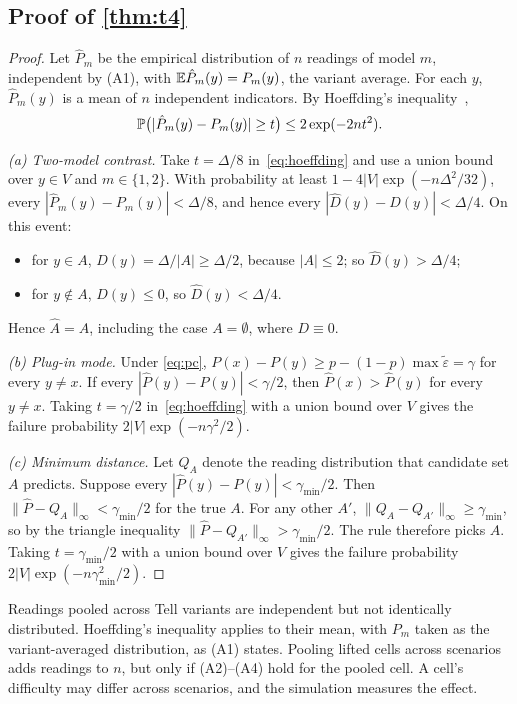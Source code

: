 \subsection{Proof of \cref{thm:t4}}

\begin{proof}
Let $\hat P_m$ be the empirical distribution of $n$ readings of model $m$, independent by (A1), with $\mathbb{E}\hat P_m(y)=P_m(y)$, the variant average. For each $y$, $\hat P_m(y)$ is a mean of $n$ independent indicators. By Hoeffding's inequality~\cite{hoeffding1963probability},
\begin{equation}
\label{eq:hoeffding}
\mathbb{P}\bigl(|\hat P_m(y)-P_m(y)|\ge t\bigr)\le2\exp(-2nt^2).
\end{equation}

\emph{(a) Two-model contrast.} Take $t=\Delta/8$ in~\eqref{eq:hoeffding} and use a union bound over $y\in V$ and $m\in\{1,2\}$. With probability at least $1-4|V|\exp(-n\Delta^2/32)$, every $|\hat P_m(y)-P_m(y)|<\Delta/8$, and hence every $|\hat D(y)-D(y)|<\Delta/4$. On this event:
\begin{itemize}[leftmargin=*]
\item for $y\in A$, $D(y)=\Delta/|A|\ge\Delta/2$, because $|A|\le2$; so $\hat D(y)>\Delta/4$;
\item for $y\notin A$, $D(y)\le0$, so $\hat D(y)<\Delta/4$.
\end{itemize}
Hence $\hat A=A$, including the case $A=\emptyset$, where $D\equiv0$.

\emph{(b) Plug-in mode.} Under \eqref{eq:pc}, $P(x)-P(y)\ge p-(1-p)\max\tilde\varepsilon=\gamma$ for every $y\neq x$. If every $|\hat P(y)-P(y)|<\gamma/2$, then $\hat P(x)>\hat P(y)$ for every $y\neq x$. Taking $t=\gamma/2$ in~\eqref{eq:hoeffding} with a union bound over $V$ gives the failure probability $2|V|\exp(-n\gamma^2/2)$.

\emph{(c) Minimum distance.} Let $Q_A$ denote the reading distribution that candidate set $A$ predicts. Suppose every $|\hat P(y)-P(y)|<\gamma_{\min}/2$. Then $\|\hat P-Q_{A}\|_\infty<\gamma_{\min}/2$ for the true $A$. For any other $A'$, $\|Q_A-Q_{A'}\|_\infty\ge\gamma_{\min}$, so by the triangle inequality $\|\hat P-Q_{A'}\|_\infty>\gamma_{\min}/2$. The rule therefore picks $A$. Taking $t=\gamma_{\min}/2$ with a union bound over $V$ gives the failure probability $2|V|\exp(-n\gamma_{\min}^2/2)$.
\end{proof}

\begin{remark}
Readings pooled across Tell variants are independent but not identically distributed. Hoeffding's inequality applies to their mean, with $P_m$ taken as the variant-averaged distribution, as (A1) states. Pooling lifted cells across scenarios adds readings to $n$, but only if (A2)--(A4) hold for the pooled cell. A cell's difficulty may differ across scenarios, and the simulation measures the effect.
\end{remark}

